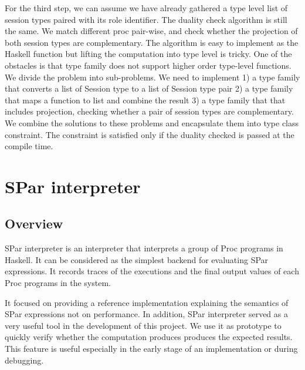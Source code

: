 For the third step, we can assume we have already gathered a type level list of session types paired  with its role identifier. The duality check algorithm is still the same. We match different proc pair-wise, and check whether the projection of both session types are complementary. The algorithm is easy to implement as the Haskell function but lifting the computation into type level is tricky. One of the obstacles is that type family does not support higher order type-level functions. We divide the problem into sub-problems. We need to implement 1) a type family that converts a list of Session type to a list of Session type pair 2) a type family that maps a function to list and combine the result 3) a type family that that includes projection, checking whether a pair of session types are complementary. We combine the solutions to these problems and encapsulate them into type class constraint. The constraint is satisfied only if the duality checked is passed at the compile time. 

\section{SPar interpreter} \label{impl:sec:interp}
\subsection{Overview}
SPar interpreter is an interpreter that interprets a group of Proc programs in Haskell. It can be considered as the simplest backend for evaluating SPar expressions. It records traces of the executions and the final output values of each Proc programs in the system. 

It focused on providing a reference implementation explaining the semantics of SPar expressions not on performance. In addition, SPar interpreter served as a very useful tool in the development of this project. We use it as prototype to quickly verify whether the computation produces produces the expected results. This feature is useful especially in the early stage of an implementation or during debugging.
